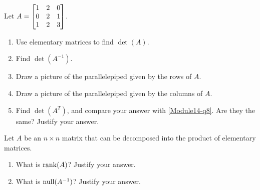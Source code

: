 \begin{exercises}
\begin{problist}
        \prob Let $A=\mat{1&2&0\\0&2&1\\1&2&3}$.
        \begin{enumerate}
			\item \label{Module14-q8}   Use elementary matrices to find $\det(A)$. 
			\item  	Find $\det(A^{-1})$.
			\item   Draw a picture of the parallelepiped given by the rows of $A$.
			\item  	Draw a picture of the parallelepiped given by the columns of $A$.
			\item   Find $\det(A^{T})$, and compare your answer with \ref{Module14-q8}. Are they the same? Justify your answer.
        \end{enumerate}
        
        \prob Let $A$ be an $n \times n$ matrix that can be decomposed into the product of elementary matrices. 
        \begin{enumerate}
			\item   What is $\operatorname{rank}(A)$?         Justify your answer.
			\item  	What is $\operatorname{null}(A^{-1})$?         Justify your answer.
        \end{enumerate}
		
	\end{problist}
\end{exercises}
